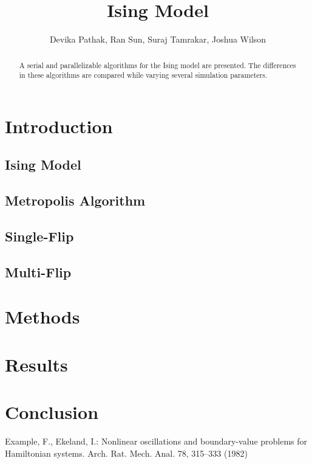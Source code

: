 \documentclass{llncs}
\begin{document}
\title{Ising Model}
%
%
\author{Devika Pathak, Ran Sun, Suraj Tamrakar, Joshua Wilson}
%
%
%

\maketitle              %

\begin{abstract}
A serial and parallelizable algorithms for the Ising model are presented. The differences in these  algorithms are compared while varying several simulation parameters. 
\end{abstract}

\section{Introduction}

\subsection{Ising Model}

\subsection{Metropolis Algorithm}
\subsection{Single-Flip}
\subsection{Multi-Flip}

\section{Methods}

\section{Results}

\section{Conclusion}

%
%
\begin{thebibliography}{5}
%
Example, F., Ekeland, I.:
Nonlinear oscillations and
boundary-value problems for Hamiltonian systems.
Arch. Rat. Mech. Anal. 78, 315--333 (1982)


\end{thebibliography}
\end{document}

